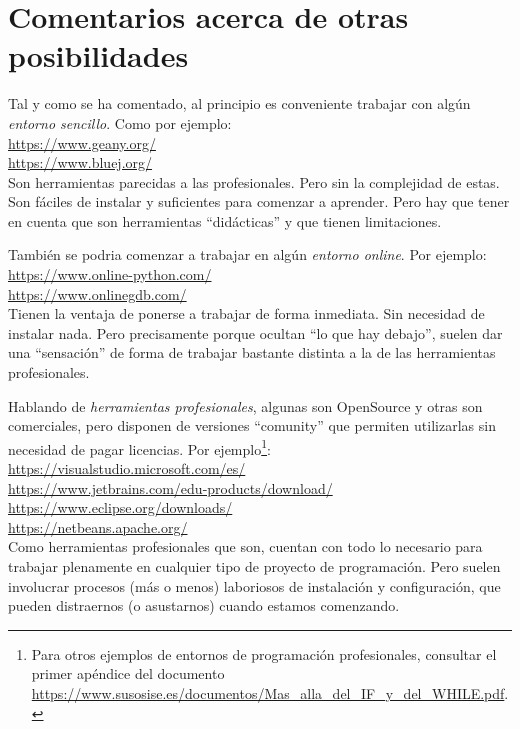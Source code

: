 \documentclass[spanish,12pt,a4paper,final,oneside]{book}
\begin{document}
\section{Comentarios acerca de otras posibilidades}
Tal y como se ha comentado, al principio es conveniente trabajar con algún \textit{entorno sencillo}. Como por ejemplo:
\\ \url{https://www.geany.org/}
\\ \url{https://www.bluej.org/}
\\Son herramientas parecidas a las  profesionales. Pero sin la complejidad de estas.
\\Son fáciles de instalar y suficientes para comenzar a aprender. Pero  hay que tener en cuenta que son herramientas ``didácticas'' y que tienen limitaciones.

\vspace{0.3cm}
También se podria comenzar a trabajar en algún \textit{entorno online}. Por ejemplo:
\\ \url{https://www.online-python.com/}
\\ \url{https://www.onlinegdb.com/}
\\Tienen la ventaja de ponerse a trabajar de forma inmediata. Sin necesidad de instalar nada. Pero precisamente porque ocultan ``lo que hay debajo'', suelen dar una ``sensación'' de forma de trabajar bastante distinta a la de las herramientas profesionales.

\vspace{0.3cm}
Hablando de \textit{herramientas profesionales}, algunas son OpenSource y otras son comerciales, pero disponen de versiones ``comunity'' que permiten utilizarlas sin necesidad de pagar licencias. Por ejemplo\footnote{Para otros ejemplos de entornos de programación profesionales, consultar el primer apéndice del documento \url{https://www.susosise.es/documentos/Mas_alla_del_IF_y_del_WHILE.pdf}.}:
\\ \url{https://visualstudio.microsoft.com/es/}
\\ \url{https://www.jetbrains.com/edu-products/download/}
\\ \url{https://www.eclipse.org/downloads/}
\\ \url{https://netbeans.apache.org/}
\\Como herramientas profesionales que son, cuentan con todo lo necesario para trabajar plenamente en cualquier tipo de proyecto de programación. Pero suelen involucrar procesos (más o menos) laboriosos de instalación y configuración, que pueden distraernos (o asustarnos) cuando estamos comenzando.
\end{document}
